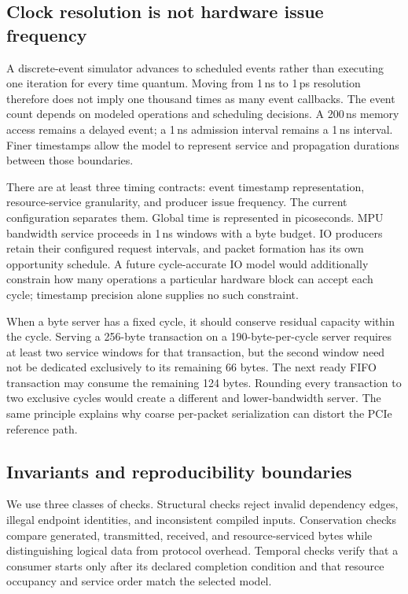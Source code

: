 \subsection{Clock resolution is not hardware issue frequency}
A discrete-event simulator advances to scheduled events rather than executing one iteration for every time quantum. Moving from 1\,ns to 1\,ps resolution therefore does not imply one thousand times as many event callbacks. The event count depends on modeled operations and scheduling decisions. A 200\,ns memory access remains a delayed event; a 1\,ns admission interval remains a 1\,ns interval. Finer timestamps allow the model to represent service and propagation durations between those boundaries.

There are at least three timing contracts: event timestamp representation, resource-service granularity, and producer issue frequency. The current configuration separates them. Global time is represented in picoseconds. MPU bandwidth service proceeds in 1\,ns windows with a byte budget. IO producers retain their configured request intervals, and packet formation has its own opportunity schedule. A future cycle-accurate IO model would additionally constrain how many operations a particular hardware block can accept each cycle; timestamp precision alone supplies no such constraint.

When a byte server has a fixed cycle, it should conserve residual capacity within the cycle. Serving a 256-byte transaction on a 190-byte-per-cycle server requires at least two service windows for that transaction, but the second window need not be dedicated exclusively to its remaining 66 bytes. The next ready FIFO transaction may consume the remaining 124 bytes. Rounding every transaction to two exclusive cycles would create a different and lower-bandwidth server. The same principle explains why coarse per-packet serialization can distort the PCIe reference path.

\subsection{Invariants and reproducibility boundaries}
We use three classes of checks. Structural checks reject invalid dependency edges, illegal endpoint identities, and inconsistent compiled inputs. Conservation checks compare generated, transmitted, received, and resource-serviced bytes while distinguishing logical data from protocol overhead. Temporal checks verify that a consumer starts only after its declared completion condition and that resource occupancy and service order match the selected model.

